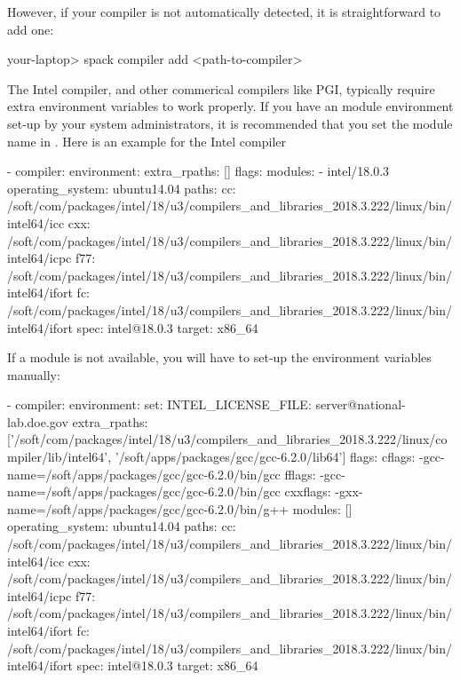 However, if your compiler is not automatically detected, it is straightforward
to add one:

\begin{shade}
your-laptop> spack compiler add <path-to-compiler>
\end{shade}

The Intel compiler, and other commerical compilers like PGI, typically
require extra environment variables to work properly. If you have an
module environment set-up by your system administrators, it is
recommended that you set the module name in
. Here is an example for the
Intel compiler
\begin{shade}
- compiler:
    environment:{}
    extra_rpaths:  []
    flags: {}
    modules:
    - intel/18.0.3
    operating_system: ubuntu14.04
    paths:
      cc: /soft/com/packages/intel/18/u3/compilers_and_libraries_2018.3.222/linux/bin/intel64/icc
      cxx: /soft/com/packages/intel/18/u3/compilers_and_libraries_2018.3.222/linux/bin/intel64/icpc
      f77: /soft/com/packages/intel/18/u3/compilers_and_libraries_2018.3.222/linux/bin/intel64/ifort
      fc: /soft/com/packages/intel/18/u3/compilers_and_libraries_2018.3.222/linux/bin/intel64/ifort
    spec: intel@18.0.3
    target: x86_64
\end{shade}

If a module is not available, you will have to set-up the environment variables manually:
\begin{shade}
- compiler:
    environment:
      set:
        INTEL_LICENSE_FILE: server@national-lab.doe.gov
    extra_rpaths:  ['/soft/com/packages/intel/18/u3/compilers_and_libraries_2018.3.222/linux/compiler/lib/intel64',
    '/soft/apps/packages/gcc/gcc-6.2.0/lib64']
    flags: 
      cflags: -gcc-name=/soft/apps/packages/gcc/gcc-6.2.0/bin/gcc
      fflags: -gcc-name=/soft/apps/packages/gcc/gcc-6.2.0/bin/gcc
      cxxflags: -gxx-name=/soft/apps/packages/gcc/gcc-6.2.0/bin/g++
    modules: []
    operating_system: ubuntu14.04
    paths:
      cc: /soft/com/packages/intel/18/u3/compilers_and_libraries_2018.3.222/linux/bin/intel64/icc
      cxx: /soft/com/packages/intel/18/u3/compilers_and_libraries_2018.3.222/linux/bin/intel64/icpc
      f77: /soft/com/packages/intel/18/u3/compilers_and_libraries_2018.3.222/linux/bin/intel64/ifort
      fc: /soft/com/packages/intel/18/u3/compilers_and_libraries_2018.3.222/linux/bin/intel64/ifort
    spec: intel@18.0.3
    target: x86_64
\end{shade}

